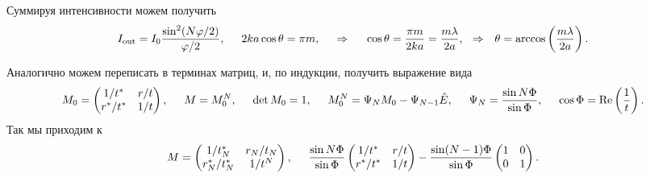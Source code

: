 Суммируя интенсивности можем получить
\begin{equation*}
    I_{\text{out}} = I_0 \frac{\sin^2 (N \varphi/2)}{\varphi/2},
    \hspace{5 mm} 
    2 k a \cos \theta = \pi m,
    \hspace{0.5cm} \Rightarrow \hspace{0.5cm}
    \cos \theta =  \frac{\pi m }{2 k a}
    = \frac{m \lambda}{2 a},
    \hspace{0.25cm} \Rightarrow \hspace{0.25cm}
    \theta = \arccos\left(\frac{m \lambda}{2a}\right).
\end{equation*}


Аналогично можем переписать в терминах матриц, и, по индукции, получить выражение вида
\begin{equation*}
    M_0 = \begin{pmatrix}
        1/t^* & r/t  \\
        r^*/t^* & 1/t  \\
    \end{pmatrix},
    \hspace{5 mm} 
    M = M_0^N, \hspace{5 mm} 
    \det M_0 = 1,
    \hspace{5 mm} 
    M_0^N = \Psi_N M_0 - \Psi_{N-1} \hat{E},
    \hspace{5 mm} 
    \Psi_N = \frac{\sin N \Phi}{\sin \Phi},
    \hspace{5 mm} 
    \cos \Phi = \Re\left(\frac{1}{t}\right).
\end{equation*}
Так мы приходим к 
\begin{equation*}
    M = \begin{pmatrix}
        1/t^*_N & r_N/t_N  \\
        r^*_N / t^*_N & 1/t^N  \\
    \end{pmatrix},
    \hspace{5 mm} 
    \frac{\sin N \Phi}{\sin \Phi} \begin{pmatrix}
        1/t^* & r/t  \\
        r^*/t^* & 1/t  \\
    \end{pmatrix} - \frac{\sin (N-1)\Phi}{\sin \Phi} \begin{pmatrix}
        1 & 0  \\
        0 & 1  \\
    \end{pmatrix}.
\end{equation*}
